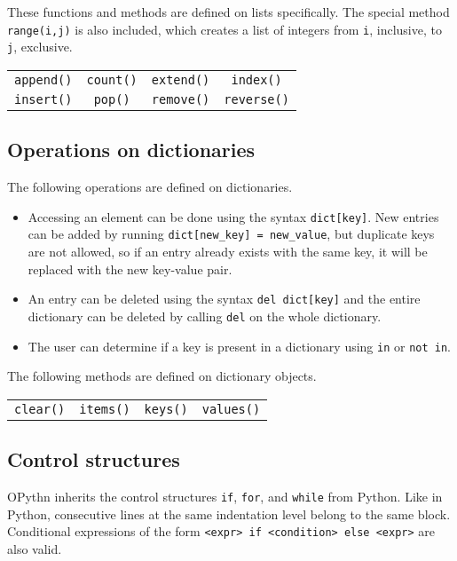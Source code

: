 \documentclass[11pt, twoside]{article}
\newcommand{\ms}{\texttt}
\begin{document}
    These functions and methods are defined on lists specifically. The special method \ms{range(i,j)} is also included, which creates a list of integers from \ms{i}, inclusive, to \ms{j}, exclusive.
    \begin{center}
        \begin{tabular}{cccc}
            \ms{append()} & \ms{count()} & \ms{extend()} & \ms{index()}\\
            \ms{insert()} & \ms{pop()} & \ms{remove()} & \ms{reverse()}\\
    \end{tabular}
    \end{center}

    \subsection{Operations on dictionaries}
    The following operations are defined on dictionaries.
    \begin{itemize}
        \item Accessing an element can be done using the syntax \ms{dict[key]}. New entries can be added by running \ms{dict[new\_key] = new\_value}, but duplicate keys are not allowed, so if an entry already exists with the same key, it will be replaced with the new key-value pair.
        \item An entry can be deleted using the syntax \ms{del dict[key]} and the entire dictionary can be deleted by calling \ms{del} on the whole dictionary.
        \item The user can determine if a key is present in a dictionary using \ms{in} or \ms{not in}.
    \end{itemize}
    The following methods are defined on dictionary objects.
    \begin{center}
        \begin{tabular}{cccc}
            \ms{clear()} & \ms{items()} & \ms{keys()} & \ms{values()}\\
    \end{tabular}
    \end{center}

    \subsection{Control structures}
    OPythn inherits the control structures \ms{if}, \ms{for}, and \ms{while} from Python. Like in Python, consecutive lines at the same indentation level belong to the same block. Conditional expressions of the form \ms{<expr> if <condition> else <expr>} are also valid.
\end{document}
